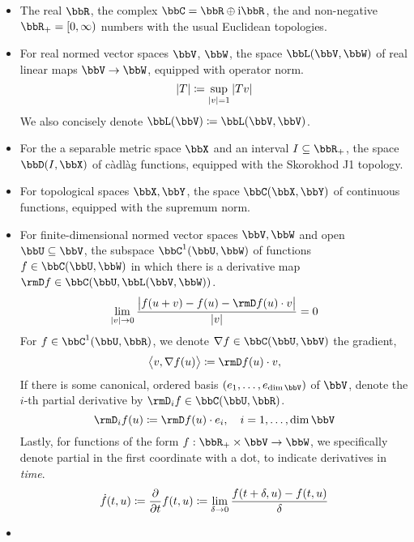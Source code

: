 \begin{itemize}
  \item
    The real $\bbR$, the complex $\bbC = \bbR \oplus \im\bbR$, the and non-negative $\bbR_+ = [0,\infty)$ numbers with the usual Euclidean topologies.
  \item
    For real normed vector spaces $\vecSpace$, $\bbW$, the space $\bbL(\vecSpace,\bbW)$ of real linear maps $\vecSpace \rightarrow \bbW$, equipped with operator norm.
    \begin{equation*}
      |T| \coloneqq \sup_{|v|=1} |Tv|
    \end{equation*}
    We also concisely denote $\bbL(\vecSpace) \defeq \bbL(\vecSpace, \vecSpace)$.
  \item
    For the a separable metric space $\stateSpace$ and an interval $I \subseteq \bbR_+$, the space $\pathSpace{I}{\stateSpace}$ of c\`adl\`ag functions, equipped with the Skorokhod J1 topology.
  \item
    For topological spaces $\stateSpace, \bbY$, the space $\cpathSpace{\stateSpace}{\bbY}$ of continuous functions, equipped with the supremum norm.
  \item
    For finite-dimensional normed vector spaces $\vecSpace, \bbW$ and open $\bbU \subseteq \vecSpace$, the subspace $\ccpathSpace{1}{\bbU}{\bbW}$ of functions $f \in \cpathSpace{\bbU}{\bbW}$ in which there is a derivative map $\Der f \in \cpathSpace{\bbU}{\bbL(\vecSpace,\bbW)}$.
    \[
      \lim_{|\vecVar|\rightarrow0} \frac{\big| f(\momentVar + \vecVar) - f(\momentVar) - \Der f(\momentVar) \cdot \vecVar\big|}{|\vecVar|} = 0
    \]
    For $f \in \ccpathSpace{1}{\bbU}{\bbR}$, we denote $\nabla f \in \cpathSpace{\bbU}{\vecSpace}$ the gradient,
    \[
      \bprj{\vecVar}{\nabla f(\momentVar)} \defeq \Der f(\momentVar) \cdot \vecVar,
    \]
    If there is some canonical, ordered basis $(\basisVec_1, \ldots, \basisVec_{\operatorname{dim}\vecSpace})$ of $\vecSpace$, denote the $i$-th partial derivative by $\Der_i f \in \cpathSpace{\bbU}{\bbR}$.
    \[
      \Der_i f(\momentVar) \defeq \Der f(\momentVar) \cdot \basisVec_i, \quad i = 1,\ldots, \operatorname{dim}\vecSpace
    \]
    Lastly, for functions of the form $f: \bbR_+ \times \vecSpace \rightarrow \bbW$, we specifically denote partial in the first coordinate with a dot, to indicate derivatives in \emph{time}.
    \[
      \dot f(t, u) \coloneqq \frac{\partial}{\partial t} f(t, u) \coloneqq \lim_{\delta\rightarrow0} \frac{f(t+\delta, u)-f(t,u)}{\delta}
    \]
  \item

\end{itemize}
